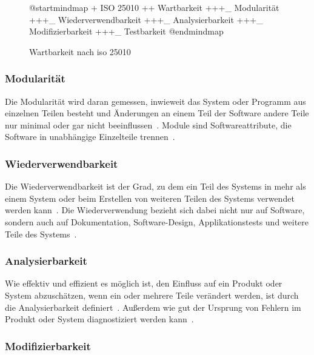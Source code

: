 \documentclass[12pt, a4paper, ngerman]{article}
\begin{document}
\begin{figure}
  \centering
  \begin{plantuml}
    @startmindmap
    + ISO 25010
    ++ Wartbarkeit
    +++_ Modularität
    +++_ Wiederverwendbarkeit
    +++_ Analysierbarkeit
    +++_ Modifizierbarkeit
    +++_ Testbarkeit
    @endmindmap
  \end{plantuml}
  \caption{Wartbarkeit nach \ac{iso} 25010~\cite{ISO25010}}
  \label{fig:uml:maintainability}
\end{figure}

\subsubsection{Modularität}

Die Modularität wird daran gemessen,
inwieweit das System oder Programm aus einzelnen Teilen besteht
und Änderungen an einem Teil der Software andere Teile nur minimal oder gar nicht beeinflussen~\cite{ISO25010}.
Module sind Softwareattribute, die Software in unabhängige Einzelteile trennen~\cite{IEEE24765}.

\subsubsection{Wiederverwendbarkeit}

Die Wiederverwendbarkeit ist der Grad,
zu dem ein Teil des Systems in mehr als einem System
oder beim Erstellen von weiteren Teilen des Systems verwendet werden kann~\cite{ISO25010}.
Die Wiederverwendung bezieht sich dabei nicht nur auf Software,
sondern auch auf Dokumentation, Software-Design, Applikationstests und weitere Teile des Systems~\cite{IEEE1517}.

\subsubsection{Analysierbarkeit}

Wie effektiv und effizient es möglich ist,
den Einfluss auf ein Produkt oder System abzuschätzen,
wenn ein oder mehrere Teile verändert werden,
ist durch die Analysierbarkeit definiert~\cite{ISO25010}.
Außerdem wie gut der Ursprung von Fehlern
im Produkt oder System diagnostiziert werden kann~\cite{ISO25010}.

\subsubsection{Modifizierbarkeit}
\end{document}
